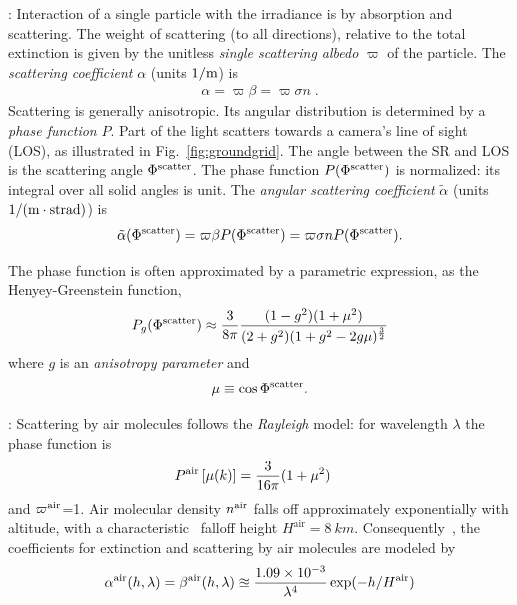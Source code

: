 \documentclass[10pt,twocolumn,letterpaper]{article}
\begin{document}
: Interaction of a single particle with the irradiance
is by absorption and scattering. The weight of scattering (to all directions), relative to the total extinction is given by the unitless {\em single scattering albedo} $\varpi$ of the particle. The {\em scattering coefficient} $\alpha$ (units $1/{\rm m}$) is
\begin{align}
  \alpha= \varpi\beta=\varpi \sigma n
  \;.
  \label{eq:alph}
\end{align}
Scattering is generally anisotropic. Its angular distribution is determined by
a {\em phase function} $P$. Part of the light scatters towards a camera's line of sight (LOS), as illustrated in
Fig.~\ref{fig:groundgrid}. The angle between the SR and LOS is the scattering angle $\Phi^{\rm scatter}$. The phase function
$P(\Phi^{\rm scatter})$ is normalized: its integral over all solid angles is unit. The {\em angular scattering coefficient}
$\tilde\alpha$ (units $1/({\rm m}\cdot{{\rm strad}})$) is
\begin{align}
  \tilde\alpha(\Phi^{\rm scatter})
  = \varpi\beta P(\Phi^{\rm scatter})
  = \varpi \sigma n P(\Phi^{\rm scatter}).
  \label{eq:alphabasic}
\end{align}

The phase function is often approximated by a parametric expression, as the Henyey-Greenstein function,
\begin{align}
  P_g(\Phi^{\rm scatter})\approx
   \frac{3} {8\pi}
   \frac{(1 - g^2)(1+\mu^2)}
        {(2+g^2)(1 + g^2 - 2g\mu)^\frac{3}{2}}
  \label{eq:aerosol_scatter}
\end{align}
where $g$ is an {\em anisotropy parameter} and
\begin{align}
  \mu\equiv \cos \Phi^{\rm scatter}.
   \label{eq:mu}
\end{align}

: Scattering by air molecules follows the {\em Rayleigh} model: for wavelength $\lambda$ the phase function is
\begin{align}
  P^{\rm air}\left[\mu(k)\right] &= \frac{3}{16\pi}(1+\mu^2)
  \label{eq:rayleighP}
\end{align}
and $\varpi^{\rm air}$=1. Air molecular density $n^{\rm air}$ falls off approximately exponentially with altitude, with a characteristic~\cite{Levi1980} falloff height $H^\mathrm{air}=8\ km$. Consequently~\cite{Levi1980}, the coefficients for extinction and scattering by air molecules are modeled by
\begin{align}
  \alpha^{\rm air}(h, \lambda)=\beta^{\rm air}(h, \lambda)
  \approxeq
  \frac{1.09 \times 10^{-3}}{\lambda^4}
  \exp(-h/H^\mathrm{air})  %
  \label{eq:rayleighbeta}
\end{align}
\end{document}

